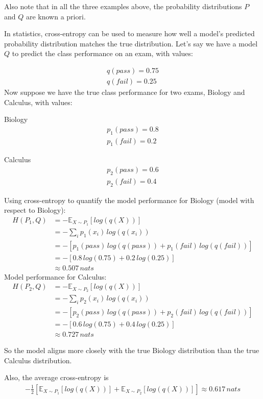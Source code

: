 \documentclass[fleqn, 12pt]{article}
\begin{document}
Also note that in all the three examples above, the probability distributions $P$ and $Q$ are known a priori.

In statistics, cross-entropy can be used to measure how well a model's predicted probability distribution matches the true distribution. Let's say we have a model $Q$ to predict the class performance on an exam, with values:

\begin{align}
    q(pass) = 0.75\\[10pt]
    q(fail) = 0.25
\end{align}
Now suppose we have the true class performance for two exams, Biology and Calculus, with values:

Biology
\begin{align}
    p_1(pass) = 0.8\\[10pt]
    p_1(fail) = 0.2
\end{align}

Calculus
\begin{align}
    p_2(pass) = 0.6\\[10pt]
    p_2(fail) = 0.4
\end{align}

Using cross-entropy to quantify the model performance for Biology (model with respect to Biology):
\begin{align}
    H(P_1, Q) & = - \mathbb{E}_{X\sim P_1}[log(q(X))]\\[10pt]
    & = -\sum_i p_1(x_i) \, log(q(x_i))\\
    & = -[p_1(pass)\,log(q(pass)) + p_1(fail)\,log(q(fail))]\\[10pt]
    & = -[0.8\,log(0.75) + 0.2\,log(0.25)]\\[10pt]
    & \approx 0.507\,nats
\end{align}
Model performance for Calculus:
\begin{align}
    H(P_2, Q) & = - \mathbb{E}_{X\sim P_2}[log(q(X))]\\[10pt]
    & = -\sum_i p_2(x_i) \, log(q(x_i))\\
    & = -[p_2(pass)\,log(q(pass)) + p_2(fail)\,log(q(fail))]\\[10pt]
    & = -[0.6\,log(0.75) + 0.4\,log(0.25)]\\[10pt]
    & \approx 0.727\,nats
\end{align}

So the model aligns more closely with the true Biology distribution than the true Calculus distribution.

Also, the average cross-entropy is
\begin{align}
    -\frac{1}{2} [\mathbb{E}_{X\sim P_1}[log(q(X))] + \mathbb{E}_{X\sim P_2}[log(q(X))]] \approx 0.617\,nats
\end{align}
\end{document}
